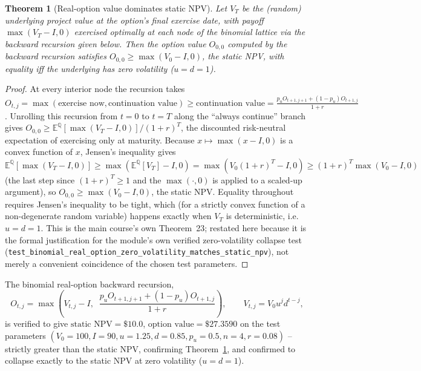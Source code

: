 \documentclass[11pt]{report}
\theoremstyle{plain}
\newtheorem{theorem}{Theorem}[chapter]
\theoremstyle{definition}
\theoremstyle{remark}
\begin{document}
\begin{theorem}[Real-option value dominates static NPV]
\label{thm:real-option}
Let $V_T$ be the (random) underlying project value at the option's
final exercise date, with payoff $\max(V_T-I,0)$ exercised optimally at
each node of the binomial lattice via the backward recursion given below. Then the
option value $O_{0,0}$ computed by the backward recursion satisfies
$O_{0,0}\ge\max(V_0-I,0)$, the static NPV, with equality iff the
underlying has zero volatility ($u=d=1$).
\end{theorem}
\begin{proof}
At every interior node the recursion takes
$O_{t,j}=\max(\text{exercise now},\text{continuation value})\ge
\text{continuation value}=\frac{p_uO_{t+1,j+1}+(1-p_u)O_{t+1,j}}{1+r}$.
Unrolling this recursion from $t=0$ to $t=T$ along the ``always
continue'' branch gives $O_{0,0}\ge\mathbb
E^{\mathbb Q}\left[\max(V_T-I,0)\right]/(1+r)^T$, the discounted
risk-neutral expectation of exercising only at maturity. Because
$x\mapsto\max(x-I,0)$ is a convex function of $x$, Jensen's inequality
gives $\mathbb E^{\mathbb Q}[\max(V_T-I,0)]\ge\max(\mathbb
E^{\mathbb Q}[V_T]-I,0)=\max(V_0(1+r)^T-I,0)\ge
(1+r)^T\max(V_0-I,0)$ (the last step since $(1+r)^T\ge1$ and the
$\max(\cdot,0)$ is applied to a scaled-up argument), so
$O_{0,0}\ge\max(V_0-I,0)$, the static NPV. Equality throughout requires
Jensen's inequality to be tight, which (for a strictly convex function
of a non-degenerate random variable) happens exactly when $V_T$ is
deterministic, i.e.\ $u=d=1$. This is the main course's own Theorem~23;
restated here because it is the formal justification for the module's
own verified zero-volatility collapse test
(\texttt{test\_\hspace{0pt}binomial\_\hspace{0pt}real\_\hspace{0pt}option\_\hspace{0pt}zero\_\hspace{0pt}volatility\_\hspace{0pt}matches\_\hspace{0pt}static\_\hspace{0pt}npv}),
not merely a convenient coincidence of the chosen test parameters.
\end{proof}

The binomial real-option backward recursion,
\begin{equation}
O_{t,j} = \max\left(V_{t,j}-I,\;\; \frac{p_u O_{t+1,j+1}+(1-p_u)O_{t+1,j}}{1+r}\right),
\qquad V_{t,j}=V_0 u^j d^{t-j},
\label{eq:binomial}
\end{equation}
is verified to give $\text{static\ NPV}=\$10.0$,
$\text{option\ value}=\$27.3590$ on the test parameters $(V_0=100,
I=90, u=1.25, d=0.85, p_u=0.5, n=4, r=0.08)$ -- strictly greater than the
static NPV, confirming Theorem~\ref{thm:real-option}, and confirmed to
collapse exactly to the static NPV at zero volatility ($u=d=1$).
\end{document}
